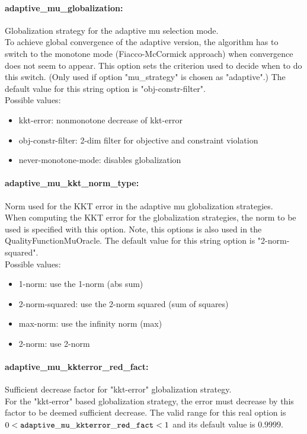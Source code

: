\paragraph{adaptive\_mu\_globalization:}\label{sec:adaptive_mu_globalization} Globalization strategy for the adaptive mu selection mode. $\;$ \\
 To achieve global convergence of the adaptive
version, the algorithm has to switch to the
monotone mode (Fiacco-McCormick approach) when
convergence does not seem to appear.  This option
sets the criterion used to decide when to do this
switch. (Only used if option "mu\_strategy" is
chosen as "adaptive".)
The default value for this string option is "obj-constr-filter".
\\ 
Possible values:
\begin{itemize}
   \item kkt-error: nonmonotone decrease of kkt-error
   \item obj-constr-filter: 2-dim filter for objective and constraint
violation
   \item never-monotone-mode: disables globalization
\end{itemize}

\paragraph{adaptive\_mu\_kkt\_norm\_type:}\label{sec:adaptive_mu_kkt_norm_type} Norm used for the KKT error in the adaptive mu globalization strategies. $\;$ \\
 When computing the KKT error for the
globalization strategies, the norm to be used is
specified with this option. Note, this options is
also used in the QualityFunctionMuOracle.
The default value for this string option is "2-norm-squared".
\\ 
Possible values:
\begin{itemize}
   \item 1-norm: use the 1-norm (abs sum)
   \item 2-norm-squared: use the 2-norm squared (sum of squares)
   \item max-norm: use the infinity norm (max)
   \item 2-norm: use 2-norm
\end{itemize}

\paragraph{adaptive\_mu\_kkterror\_red\_fact:}\label{sec:adaptive_mu_kkterror_red_fact} Sufficient decrease factor for "kkt-error" globalization strategy. $\;$ \\
 For the "kkt-error" based globalization strategy,
the error must decrease by this factor to be
deemed sufficient decrease. The valid range for this real option is 
$0 <  {\tt adaptive\_mu\_kkterror\_red\_fact } <  1$
and its default value is $0.9999$.


